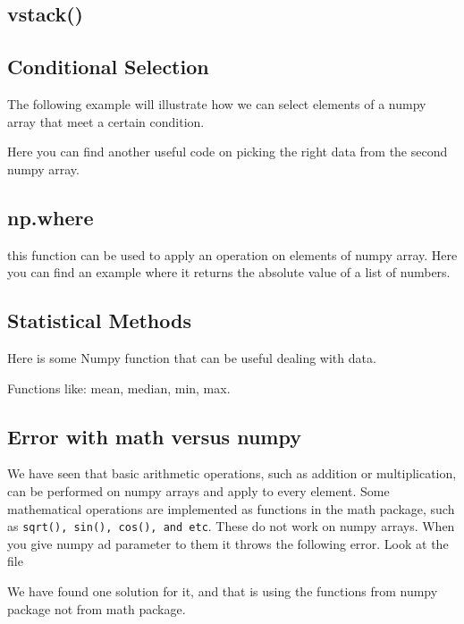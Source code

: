 \documentclass[10pt,a4paper]{article}
\newcommand{\te}{\texttt}
\begin{document}
\subsection{vstack()}

\subsection{Conditional Selection}
The following example will illustrate how we can select elements of a numpy array that meet a certain condition. 

Here you can find another useful code on picking the right data from the second numpy array.



\subsection{np.where}
this function can be used to apply an operation on elements of numpy array. Here you can find an example where it returns the absolute value of a list of numbers.


\subsection{Statistical Methods}
Here is some Numpy function that can be useful dealing with data. 

Functions like: mean, median, min, max. 




\subsection{Error with math versus numpy}
We have seen that basic arithmetic operations, such as addition or multiplication, can be performed on numpy arrays and apply to every element. Some mathematical operations are implemented as functions in the math package, such as \te{sqrt(), sin(), cos(), and etc}. These do not work on numpy arrays. When you give numpy ad parameter to them it throws the following error. Look at the file



We have found one solution for it, and that is using the functions from numpy package not from math package.


\end{document}
